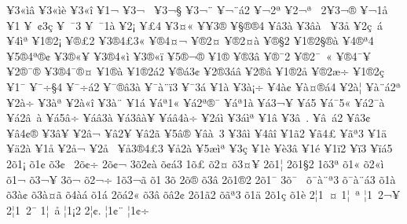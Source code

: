 {^^a53^^ab^^ec^^e2
^^a53^^ab^^ec^^e8
^^a53^^ab^^ee
^^a51^^ac
^^a53^^ac^^a0
^^a53^^ac^^a7
^^a53^^ac^^a8
^^a5^^ac^^a8^^e12
^^a5^^ac2^^aa
^^a52^^ac^^aa^^a0
2^^a53^^ac^^ae
^^a5^^ac1^^e5
^^a51^^ad
^^a5^^ad^^a0^^a23^^e7
^^a5^^ad^^a0^^af3
^^a5^^ad^^a0^^af1^^e0
^^a52^^ad^^a1
^^a5^^ad^^a34
^^a5^^ad3^^a4^^ab
^^a5^^ad^^a53^^ae
^^a5^^ad^^a7^^ae^^ae4
^^a5^^ad^^e23^^e0
^^a5^^ad3^^e2^^e0^^a0
^^a53^^ad^^e5
^^a52^^ad^^e7^^a0^^e1
^^a54^^ad^^ec^^aa
^^a51^^ae2^^a1
^^a5^^ae^^a32
^^a53^^ae4^^a33^^ab
^^a5^^ae4^^a4^^ac
^^a5^^ae2^^a4^^ad
^^a5^^ae2^^a4^^e0
^^a5^^ae^^a72
^^a51^^ae2^^a7^^ae^^e0
^^a54^^ae^^aa4
^^a55^^ae4^^aa^^ae^^a2
^^a53^^ae^^ab^^a5
^^a53^^ae4^^ab^^ec
^^a53^^ae^^ab^^ef
^^a55^^ae^^ac^^ae
^^a51^^ae^^ad
^^a5^^ae3^^ad^^e2
^^a5^^ae^^af2
^^a5^^ae2^^af^^a0^^ab
^^a5^^ae4^^af^^a5
^^a52^^ae^^af^^ae
^^a53^^ae4^^af^^ae^^a4
^^a51^^ae^^e0
^^a51^^ae2^^e12
^^a5^^ae^^e13^^a2
^^a52^^ae3^^e1^^e2
^^a52^^ae^^e2
^^a51^^ae2^^e5
^^a5^^ae2^^e6^^f7
^^a51^^ae2^^e7
^^a51^^af
^^a5^^af^^f7^^a74
^^a5^^af^^f7^^e12
^^a5^^af^^ae^^e23^^e0
^^a5^^af^^e0^^a8^^ef3
^^a5^^af3^^e1
^^a51^^e0
^^a53^^e0^^a1^^f7
^^a54^^e0^^a2^^ad
^^a5^^e0^^a4^^ae^^e14
^^a52^^e0^^a6
^^a5^^e0^^a8^^e12^^aa
^^a52^^e0^^f7^^ad
^^a53^^e0^^aa
^^a52^^e0^^ab^^ee
^^a53^^e0^^ad^^a8
^^a51^^e1
^^a5^^e1^^aa1^^ab
^^a5^^e12^^aa^^ae^^af
^^a5^^e1^^aa1^^e0
^^a5^^e13^^ac^^a5
^^a5^^e15^^ad
^^a5^^e1^^af5^^ab
^^a5^^e12^^af^^e0
^^a5^^e12^^e2^^a0^^e0
^^a5^^e15^^e2^^f7
^^a5^^e1^^e23^^e0
^^a5^^e13^^e2^^e0^^a5
^^a5^^e1^^e24^^e0^^f7
^^a52^^e1^^ec
^^a53^^e1^^ec^^aa
^^a51^^e2
^^a53^^e2^^a0.
^^a5^^e2^^a0^^e12
^^a5^^e23^^a2
^^a5^^e24^^a2^^ae
^^a53^^e2^^a5
^^a52^^e2^^ac
^^a5^^e22^^ad^^a5
^^a5^^e22^^ad^^e3
^^a55^^e2^^ae
^^a5^^e2^^e0^^a0^^ad3
^^a53^^e2^^ec
^^a54^^e2^^ee
^^a51^^e32
^^a5^^e34^^a3
^^a5^^e3^^aa3
^^a51^^e4
^^a5^^e42^^e0
^^a51^^e5
^^a52^^e5^^ac
^^a52^^e5^^ad^^a0
^^a5^^e53^^ae4^^a33
^^a5^^e52^^e0
^^a55^^e6^^ec^^aa
^^a53^^e7
^^a51^^e8
^^a5^^e83^^e2
^^a51^^e9
^^a51^^ef2
^^a5^^ef3^^ad
^^a5^^ef^^e15
2^^f51^^a1
^^f51^^a2
^^f53^^a2^^a0
2^^f5^^a2^^f7
2^^f5^^a2^^ac
3^^f52^^a2^^e0
^^f5^^a2^^e13
1^^f5^^a3
^^f52^^a4
^^f53^^a4^^a5
2^^f51^^a6
2^^f51^^a72
1^^f53^^aa
^^f51^^ab
^^f52^^ab^^ec
^^f51^^ac
^^f53^^ac^^a5
3^^f5^^ac^^ad
^^f52^^ac^^ad^^f7
1^^f53^^ac^^e3
^^f51^^ad
3^^f5^^ad^^ad
2^^f5^^ad^^ae
^^f53^^ad^^e2
2^^f51^^ae2
2^^f51^^af
3^^f5^^af^^a0
^^f5^^af^^e0^^a8^^aa3
^^f5^^af^^e0^^a8^^e13
^^f51^^e0
^^f53^^e0^^a2
^^f53^^e0^^a4^^e3
^^f54^^e0^^e1
^^f51^^e1
2^^f5^^e12^^ab
^^f53^^e2
^^f5^^e22^^a2
2^^f51^^e32
^^f5^^e3^^aa3
^^f51^^e4
2^^f51^^e7
^^f51^^e8
2^^a61^^a0^^a4
1^^a6^^a0^^aa
^^a61^^a02^^ac^^a5
2^^a61^^a02^^af
1^^a6^^a0^^e5
^^a61^^a12
2^^a6^^a2.
^^a61^^a2^^a8
^^a61^^a2^^f7
}
